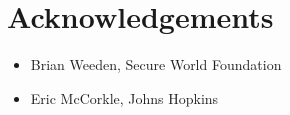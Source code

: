 \section*{Acknowledgements}

\begin{itemize}

\item Brian Weeden, Secure World Foundation

\item Eric McCorkle, Johns Hopkins

\end{itemize}
